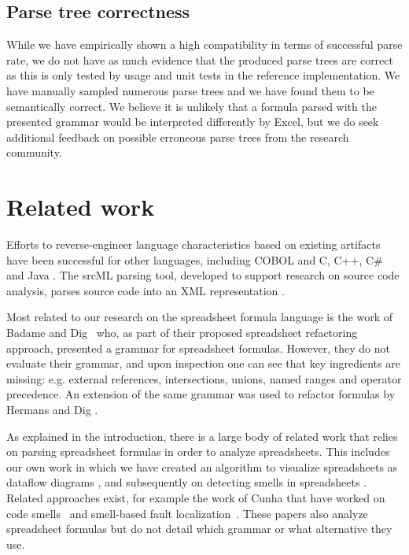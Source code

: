 \documentclass[conference]{IEEEtran}
\begin{document}
\subsection{Parse tree correctness}

While we have empirically shown a high compatibility in terms of successful parse rate, we do not have as much evidence that the produced parse trees are correct as this is only tested by usage and unit tests in the reference implementation. We have manually sampled numerous parse trees and we have found them to be semantically correct. We believe it is unlikely that a formula parsed with the presented grammar would be interpreted differently by Excel, but we do seek additional feedback on possible erroneous parse trees from the research community.

\section{Related work}
\label{section:relatedWork}
Efforts to reverse-engineer language characteristics based on existing artifacts have been successful for other languages, including COBOL \cite{van1997obtaining} and C, C++, C\# and Java \cite{zaytsev2010recovery}. The srcML parsing tool, developed to support research on source code analysis, parses source code into an XML representation \cite{srcML}.

Most related to our research on the spreadsheet formula language is the work of Badame and Dig~\cite{badame2012refactoring} who, as part of their proposed spreadsheet refactoring approach, presented a grammar for spreadsheet formulas. However, they do not evaluate their grammar, and upon inspection one can see that key ingredients are missing: e.g. external references, intersections, unions, named ranges and operator precedence. An extension of the same grammar was used to refactor formulas by Hermans and Dig \cite{hermans2014bumblebee}.

As explained in the introduction, there is a large body of related work that relies on parsing spreadsheet formulas in order to analyze spreadsheets. This includes our own work in which we have created an algorithm to visualize spreadsheets as dataflow diagrams \cite{DBLP:conf/icse/HermansPD11}, and subsequently on detecting smells in spreadsheets \cite{DBLP:conf/icse/HermansPD12,DBLP:conf/icsm/Hermans212}. Related approaches exist, for example the work of Cunha that have worked on code smells~\cite{iccsa12} and smell-based fault localization~\cite{conf/icsme/CunhaFMPS14}. These papers also analyze spreadsheet formulas but do not detail which grammar or what alternative they use.
\end{document}
